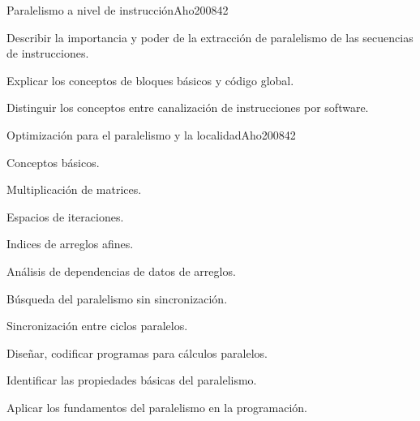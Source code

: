 \begin{syllabus}
\begin{unit}{Paralelismo a nivel de instrucción}{Aho2008}{4}{2}
  \begin{learningoutcomes}
     \item Describir la importancia y poder de la extracción de paralelismo de las secuencias de instrucciones.
     \item Explicar los conceptos de bloques básicos y código global.
     \item Distinguir los conceptos entre canalización de instrucciones por software.
  \end{learningoutcomes}
\end{unit}

\begin{unit}{Optimización para el paralelismo y la localidad}{Aho2008}{4}{2}
  \begin{topics}
     \item Conceptos básicos.
     \item Multiplicación de matrices.
     \item Espacios de iteraciones.
     \item Indices de arreglos afines.
     \item Análisis de dependencias de datos de arreglos.
     \item Búsqueda del paralelismo sin sincronización.
     \item Sincronización entre ciclos paralelos.
  \end{topics}

  \begin{learningoutcomes}
     \item Diseñar, codificar programas para cálculos paralelos.
     \item Identificar las propiedades básicas del paralelismo.
     \item Aplicar los fundamentos del paralelismo en la programación.
  \end{learningoutcomes}
\end{unit}



\begin{coursebibliography}
\end{coursebibliography}

\end{syllabus}
